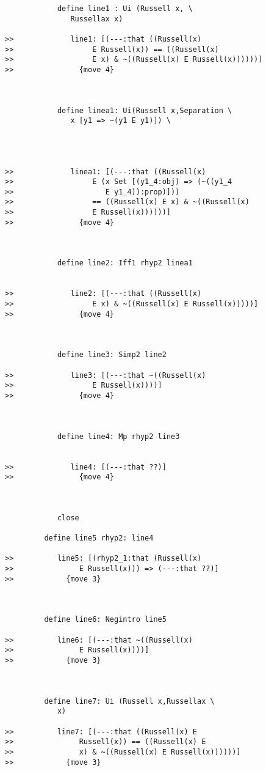 \documentclass[12pt]{article}
\begin{document}
\begin{verbatim}
            define line1 : Ui (Russell x, \
               Russellax x)

>>             line1: [(---:that ((Russell(x)
>>                  E Russell(x)) == ((Russell(x)
>>                  E x) & ~((Russell(x) E Russell(x))))))]
>>               {move 4}



            define linea1: Ui(Russell x,Separation \
               x [y1 => ~(y1 E y1)]) \
               



>>             linea1: [(---:that ((Russell(x)
>>                  E (x Set [(y1_4:obj) => (~((y1_4
>>                     E y1_4)):prop)]))
>>                  == ((Russell(x) E x) & ~((Russell(x)
>>                  E Russell(x))))))]
>>               {move 4}



            define line2: Iff1 rhyp2 linea1


>>             line2: [(---:that ((Russell(x)
>>                  E x) & ~((Russell(x) E Russell(x)))))]
>>               {move 4}



            define line3: Simp2 line2

>>             line3: [(---:that ~((Russell(x)
>>                  E Russell(x))))]
>>               {move 4}



            define line4: Mp rhyp2 line3


>>             line4: [(---:that ??)]
>>               {move 4}



            close

         define line5 rhyp2: line4

>>          line5: [(rhyp2_1:that (Russell(x)
>>               E Russell(x))) => (---:that ??)]
>>            {move 3}



         define line6: Negintro line5

>>          line6: [(---:that ~((Russell(x)
>>               E Russell(x))))]
>>            {move 3}



         define line7: Ui (Russell x,Russellax \
            x)

>>          line7: [(---:that ((Russell(x) E
>>               Russell(x)) == ((Russell(x) E
>>               x) & ~((Russell(x) E Russell(x))))))]
>>            {move 3}




\end{verbatim}
\end{document}
